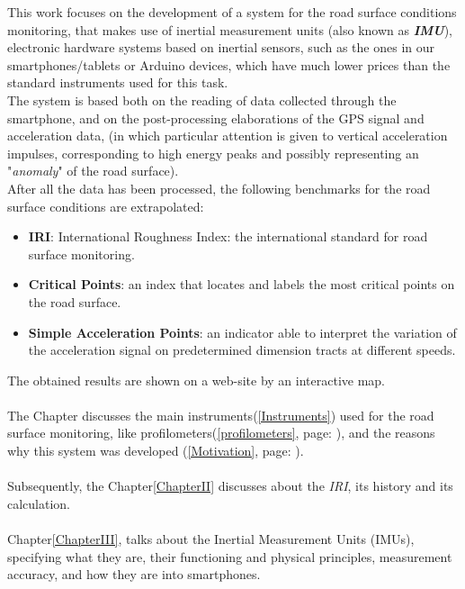 \documentclass{standalone}
\begin{document}
\noindent
This work focuses on the development of a system for the road surface conditions monitoring, that makes use of inertial measurement units (also known as \textbf{\textit{IMU}}), electronic hardware systems based on inertial sensors, such as the ones in our smartphones/tablets or Arduino devices, which have much lower prices than the standard instruments used for this task.\\
The system is based both on the reading of data collected through the smartphone, and on the post-processing elaborations of the GPS signal and acceleration data, (in which particular attention is given to vertical acceleration impulses, corresponding to high energy peaks and possibly representing an "\textit{anomaly}" of the road surface).\\
After all the data has been processed, the following benchmarks for the road surface conditions are extrapolated:
\begin{itemize}\label{indexes}
\item \textbf{IRI}: International Roughness Index: the international standard for road surface monitoring.
\item \textbf{Critical Points}: an index that locates and labels the most critical points on the road surface.
\item \textbf{Simple Acceleration Points}: an indicator able to interpret the variation of the acceleration signal on predetermined dimension tracts at different speeds.
\end{itemize}
\clearpage
\noindent The obtained results are shown on a web-site by an interactive map.
\\\\
The  Chapter discusses the main instruments{\footnotesize (\ref{Instruments})} used for the road surface monitoring, like profilometers{\footnotesize (\ref{profilometers}, page: \pageref{profilometers})}, and the reasons why this system was developed  {\footnotesize (\ref{Motivation}, page: \pageref{Motivation})}.\\\\
Subsequently, the Chapter\ref{ChapterII} discusses about the \textit{IRI}, its history and its calculation.\\\\
Chapter\ref{ChapterIII}, talks about the Inertial Measurement Units (IMUs), specifying what they are, their functioning and physical principles, measurement accuracy, and how they are into smartphones.\\\\
\end{document}
